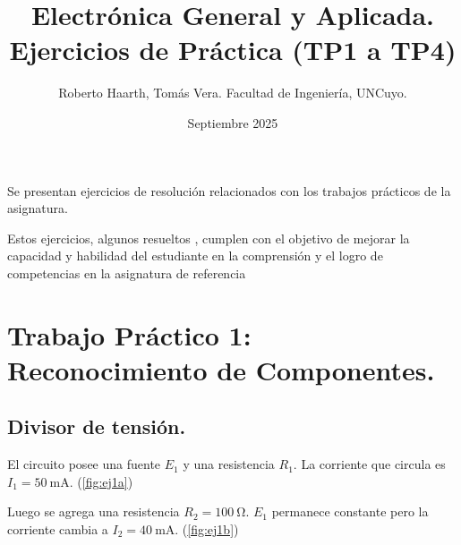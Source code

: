 \documentclass{article}
\title{Electrónica General y Aplicada. Ejercicios de Práctica (TP1 a TP4)}
\author{Roberto Haarth, Tomás Vera. Facultad de Ingeniería, UNCuyo.}
\date{Septiembre 2025}
\begin{document}
\maketitle
\pagebreak

Se presentan ejercicios de resolución relacionados con los trabajos prácticos de la asignatura.

Estos ejercicios, algunos resueltos , cumplen con el objetivo de mejorar la capacidad y habilidad del estudiante en la comprensión y el logro 
de competencias en la asignatura de referencia

\begin{center}
\end{center}

\section{Trabajo Práctico 1: Reconocimiento de Componentes.}

\subsection{Divisor de tensión.}

El circuito posee una fuente $E_1$ y una resistencia $R_1$. La corriente que circula es $I_1 = \qty{50}{\milli\ampere}$. (\ref{fig:ej1a})

Luego se agrega una resistencia $R_2=\qty{100}{\ohm}$. $E_1$ permanece constante pero la corriente cambia a $I_2=\qty{40}{\milli\ampere}$. (\ref{fig:ej1b})


    \begin{figure}
        \vspace{-15mm}
        \centering
        \hspace{1mm}
    \end{figure}
\end{document}

